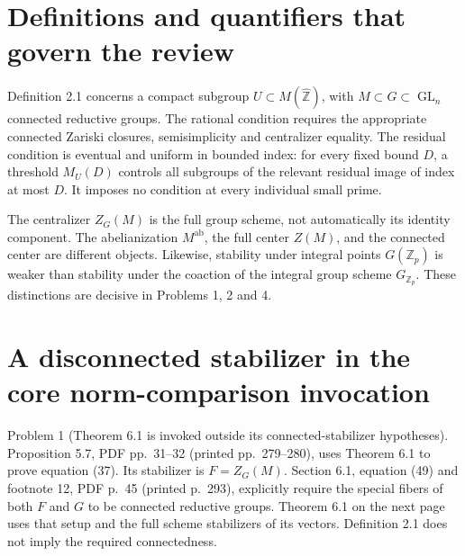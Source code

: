 \documentclass[10pt]{article}
\begin{document}
\section*{Definitions and quantifiers that govern the review}
Definition 2.1 concerns a compact subgroup \(U\subset M(\widehat{\mathbb Z})\), with \(M\subset G\subset\operatorname{GL}_n\) connected reductive groups. The rational condition requires the appropriate connected Zariski closures, semisimplicity and centralizer equality. The residual condition is eventual and uniform in bounded index: for every fixed bound \(D\), a threshold \(M_U(D)\) controls all subgroups of the relevant residual image of index at most \(D\). It imposes no condition at every individual small prime.\par
The centralizer \(Z_G(M)\) is the full group scheme, not automatically its identity component. The abelianization \(M^{\mathrm{ab}}\), the full center \(Z(M)\), and the connected center are different objects. Likewise, stability under integral points \(G(\mathbb Z_p)\) is weaker than stability under the coaction of the integral group scheme \(G_{\mathbb Z_p}\). These distinctions are decisive in Problems 1, 2 and 4.\par
\section*{A disconnected stabilizer in the core norm-comparison invocation}
Problem 1 (Theorem 6.1 is invoked outside its connected-stabilizer hypotheses).  Proposition 5.7, PDF pp. 31–32 (printed pp. 279–280), uses Theorem 6.1 to prove equation (37). Its stabilizer is \(F=Z_G(M)\). Section 6.1, equation (49) and footnote 12, PDF p. 45 (printed p. 293), explicitly require the special fibers of both \(F\) and \(G\) to be connected reductive groups. Theorem 6.1 on the next page uses that setup and the full scheme stabilizers of its vectors. Definition 2.1 does not imply the required connectedness.\par
\end{document}
